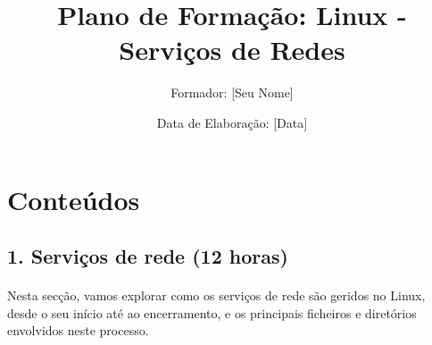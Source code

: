 \documentclass[10pt,a4paper]{article}
\title{Plano de Formação: Linux - Serviços de Redes}
\author{Formador: [Seu Nome]}
\date{Data de Elaboração: [Data]}
\begin{document}
	
	\section*{Conteúdos}
	
	\subsection*{1. Serviços de rede (12 horas)}
	\vspace{-1.2em}
	\paragraph{}
	Nesta secção, vamos explorar como os serviços de rede são geridos no Linux, desde o seu início até ao encerramento, e os principais ficheiros e diretórios envolvidos neste processo.
	
\end{document}
